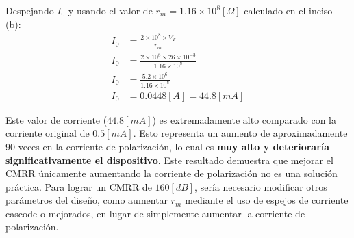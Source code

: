 \documentclass[
  11pt,
  letterpaper,
   addpoints,
   answers
  ]{exam}
\begin{document}
\begin{questions}
\begin{parts}
\begin{solution}
Despejando $I_0$ y usando el valor de $r_m = 1.16 \times 10^8[\Omega]$ calculado en el inciso (b):
\begin{align}
  I_0 &= \frac{2 \times 10^8 \times V_T}{r_m}\\
  I_0 &= \frac{2 \times 10^8 \times 26 \times 10^{-3}}{1.16 \times 10^8}\\
  I_0 &= \frac{5.2 \times 10^6}{1.16 \times 10^8}\\
  I_0 &= 0.0448[A] = 44.8[mA]
\end{align}

Este valor de corriente ($44.8[mA]$) es extremadamente alto comparado con la corriente original de $0.5[mA]$. Esto representa un aumento de aproximadamente 90 veces en la corriente de polarización, lo cual es \textbf{muy alto y deterioraría significativamente el dispositivo}. Este resultado demuestra que mejorar el CMRR únicamente aumentando la corriente de polarización no es una solución práctica. Para lograr un CMRR de $160[dB]$, sería necesario modificar otros parámetros del diseño, como aumentar $r_m$ mediante el uso de espejos de corriente cascode o mejorados, en lugar de simplemente aumentar la corriente de polarización.
\end{solution}
\end{parts}

\end{questions}
\end{document}
